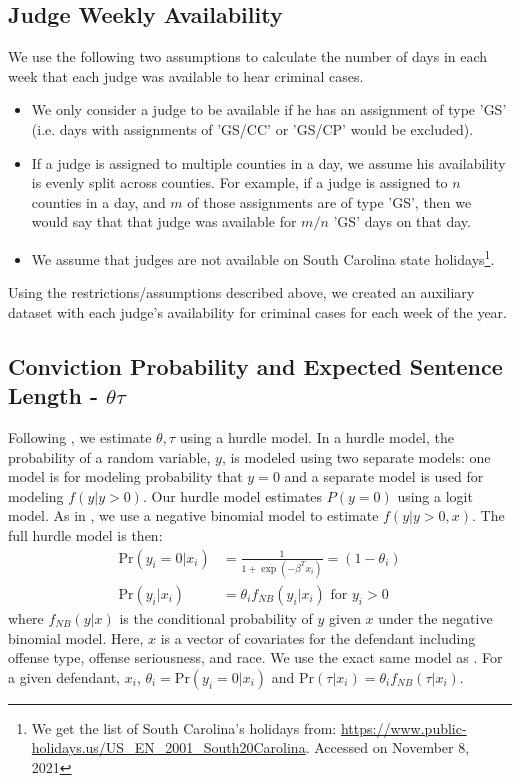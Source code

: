 \documentclass[11pt, oneside]{article}   	%
\theoremstyle{ModifiedStyle}
\begin{document}
  \subsection{Judge Weekly Availability}
	  We use the following two assumptions to calculate the number of days in each week that each judge was available to
		hear criminal cases.
		\begin{itemize}
			\item We only consider a judge to be available if he has an assignment of type 'GS' (i.e. days with assignments of 'GS/CC' or 'GS/CP' would be excluded).
			\item If a judge is assigned to multiple counties in a day, we assume his availability is evenly split across counties. For example, if a judge is assigned to $n$ counties in a day, and $m$ of those assignments are of type 'GS', then we would say that that judge was available for $m/n$ 'GS' days on that day.
			\item We assume that judges are not available on South Carolina state holidays\footnote{We get the list of South Carolina's holidays from: \url{https://www.public-holidays.us/US_EN_2001_South20Carolina}. Accessed on November 8, 2021}.
		\end{itemize}

		Using the restrictions/assumptions described above, we created an auxiliary dataset with each judge's availability for criminal cases for each week of the year.

	\subsection{Conviction Probability and Expected Sentence Length - $\theta \tau$}
	  \label{theta-tau-estimation}

		Following \cite{hester2017conditional}, we estimate $\theta,\tau$ using a hurdle model. In a hurdle model, the probability of a random variable, $y$, is modeled using two separate models: one model is for modeling probability that $y=0$ and a separate model is used for modeling $f(y|y>0)$. Our hurdle model estimates $P(y=0)$ using a logit model. As in \cite{hester2017conditional}, we use a negative binomial model to estimate $f(y|y>0,x)$. The full hurdle model is then:
		\begin{align*}
		  \text{Pr}(y_i=0|x_i) &= \frac{1}{1+\exp(-\beta^Tx_i)} = (1-\theta_i)\\
			\text{Pr}(y_i|x_i) &= \theta_i f_{NB}(y_i|x_i) \text{ for } y_i > 0
		\end{align*}
		where $f_{NB}(y|x)$ is the conditional probability of $y$ given $x$ under the negative binomial model. Here, $x$ is a vector of covariates for the defendant including offense type, offense seriousness, and race. We use the exact same model as \cite{hester2017conditional}. For a given defendant, $x_i$,  $\theta_i =\text{Pr}(y_i=0|x_i)$ and $ \text{Pr}(\tau|x_i) = \theta_i f_{NB}(\tau|x_i)$.
\end{document}
